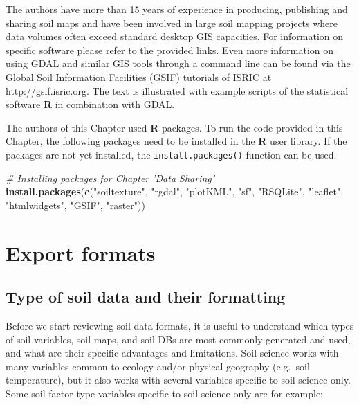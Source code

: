 \documentclass[10pt,b5paper,]{book}
\newenvironment{Shaded}{\begin{snugshade}}{\end{snugshade}}
\newcommand{\CommentTok}[1]{\textcolor[rgb]{0.56,0.35,0.01}{\textit{#1}}}
\newcommand{\KeywordTok}[1]{\textcolor[rgb]{0.13,0.29,0.53}{\textbf{#1}}}
\newcommand{\NormalTok}[1]{#1}
\newcommand{\StringTok}[1]{\textcolor[rgb]{0.31,0.60,0.02}{#1}}
\theoremstyle{definition}
\theoremstyle{definition}
\theoremstyle{definition}
\theoremstyle{remark}
\begin{document}
The authors have more than 15 years of experience in producing,
publishing and sharing soil maps and have been involved in large soil
mapping projects where data volumes often exceed standard desktop GIS
capacities. For information on specific software please refer to the
provided links. Even more information on using GDAL and similar GIS
tools through a command line can be found via the Global Soil
Information Facilities (GSIF) tutorials of ISRIC at
\url{http://gsif.isric.org}. The text is illustrated with example
scripts of the statistical software \textbf{R} in combination with GDAL.

The authors of this Chapter used \textbf{R} packages. To run the code
provided in this Chapter, the following packages need to be installed in
the \textbf{R} user library. If the packages are not yet installed, the
\texttt{install.packages()} function can be used.

\begin{Shaded}
\begin{Highlighting}[]
\CommentTok{# Installing packages for Chapter 'Data Sharing'}
\KeywordTok{install.packages}\NormalTok{(}\KeywordTok{c}\NormalTok{(}\StringTok{"soiltexture"}\NormalTok{, }\StringTok{"rgdal"}\NormalTok{, }\StringTok{"plotKML"}\NormalTok{,}
                   \StringTok{"sf"}\NormalTok{, }\StringTok{"RSQLite"}\NormalTok{, }\StringTok{"leaflet"}\NormalTok{,}
                   \StringTok{"htmlwidgets"}\NormalTok{, }\StringTok{"GSIF"}\NormalTok{, }\StringTok{"raster"}\NormalTok{))}
\end{Highlighting}
\end{Shaded}

\hypertarget{export-formats}{%
\section{Export formats}\label{export-formats}}

\hypertarget{type-of-soil-data-and-their-formatting}{%
\subsection{Type of soil data and their
formatting}\label{type-of-soil-data-and-their-formatting}}

Before we start reviewing soil data formats, it is useful to understand
which types of soil variables, soil maps, and soil DBs are most commonly
generated and used, and what are their specific advantages and
limitations. Soil science works with many variables common to ecology
and/or physical geography (e.g.~soil temperature), but it also works
with several variables specific to soil science only. Some soil
factor-type variables specific to soil science only are for example:
\end{document}
